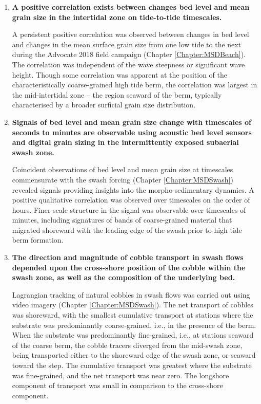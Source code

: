 \begin{enumerate}
	
	
	\item \textbf{A positive correlation exists between changes bed level and mean grain size in the intertidal zone on tide-to-tide timescales.} 
	
	A persistent positive correlation was observed between changes in bed level and changes in the mean surface grain size from one low tide to the next during the Advocate 2018 field campaign (Chapter \ref{Chapter:MSDBeach}). The correlation was independent of the wave steepness or significant wave height. Though some correlation was apparent at the position of the characteristically coarse-grained high tide berm, the correlation was largest in the mid-intertidal zone -- the region seaward of the berm, typically characterised by a broader surficial grain size distribution.
	
	
	\item \textbf{Signals of bed level and mean grain size change with timescales of seconds to minutes are observable using acoustic bed level sensors and digital grain sizing in the intermittently exposed subaerial swash zone.}
	
	Coincident observations of bed level and mean grain size at timescales commensurate with the swash forcing (Chapter \ref{Chapter:MSDSwash}) revealed signals providing insights into the morpho-sedimentary dynamics. A positive qualitative correlation was observed over timescales on the order of hours. Finer-scale structure in the signal was observable over timescales of minutes, including signatures of bands of coarse-grained material that migrated shoreward with the leading edge of the swash prior to high tide berm formation.
	
	
	\item \textbf{The direction and magnitude of cobble transport in swash flows depended upon the cross-shore position of the cobble within the swash zone, as well as the composition of the underlying bed.}

	Lagrangian tracking of natural cobbles in swash flows was carried out using video imagery (Chapter \ref{Chapter:MSDSwash}). The net transport of cobbles was shoreward, with the smallest cumulative transport at stations where the substrate was predominantly coarse-grained, i.e., in the presence of the berm. When the substrate was predominantly fine-grained, i.e., at stations seaward of the coarse berm, the cobble tracers diverged from the mid-swash zone, being transported either to the shoreward edge of the swash zone, or seaward toward the step. The cumulative transport was greatest where the substrate was fine-grained, and the net transport was near zero. The longshore component of transport was small in comparison to the cross-shore component.
	
	
	
\end{enumerate}


